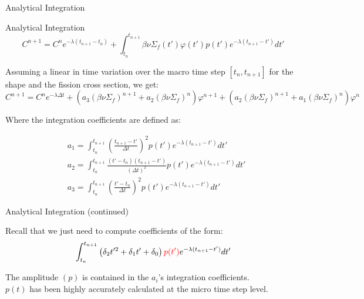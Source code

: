 \documentclass[8pt]{beamer}
\newcommand{\be}{\begin{equation}}
\newcommand{\ee}{\end{equation}}
\newcommand{\tcr}[1]{\textcolor{red}{#1}}
\begin{document}
\begin{frame}{Analytical Integration}


\begin{block}{Analytical Integration}
\be
C^{n+1} =  C^n e^{-\lambda (t_{n+1} - t_n) }  + \int_{t_n}^{t_{n+1}} \beta\nu\Sigma_f(t')\varphi(t') p(t')e^{-\lambda (t_{n+1}-t')}dt'
\ee
\end{block}

\begin{block}{}
Assuming a linear in time variation over the macro time step $[t_n, t_{n+1}]$ for the shape and the fission cross section, we get:
\be
C^{n+1} = C^n e^{-\lambda \Delta t} 
+ \left(a_3(\beta\nu\Sigma_f)^{n+1}+a_2(\beta\nu\Sigma_f)^n\right)\varphi^{n+1}
+ \left(a_2(\beta\nu\Sigma_f)^{n+1}+a_1(\beta\nu\Sigma_f)^n\right)\varphi^n 
\ee

Where the integration coefficients are defined as:

\begin{align}
&a_1 = \int_{t_n}^{t_{n+1}}\left(\frac{t_{n+1}-t'}{\Delta t}\right)^2p(t')e^{-\lambda(t_{n+1}-t')}dt' \\
&a_2= \int_{t_n}^{t_{n+1}}\frac{(t'-t_n)(t_{n+1}-t')}{(\Delta t)^2}p(t')e^{-\lambda(t_{n+1}-t')}dt' \\
&a_3 = \int_{t_n}^{t_{n+1}}\left(\frac{t'-t_n}{\Delta t}\right)^2p(t')e^{-\lambda(t_{n+1}-t')}dt'
\end{align}


\end{block}

\end{frame}

\begin{frame}{Analytical Integration (continued)}

Recall that we just need to compute  coefficients of the form:
\be
\int_{t_n}^{t_{n+1}}\left(\delta_2 t'^2 + \delta_1 t' +\delta_0\right) \tcr{p(t')}e^{-\lambda(t_{n+1}-t')}dt' 
\ee

\begin{block}{}

The amplitude $(p)$ is contained in the $a_i$'s integration coefficients.\\
$p(t)$ has been highly accurately calculated at the micro time step level.

\end{block}

\end{frame}
\end{document}
